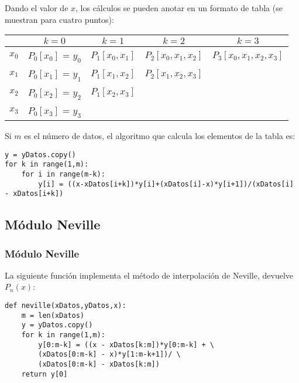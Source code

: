 \begin{frame}
Dando el valor de $x$, los cálculos se pueden anotar en un formato de tabla (se muestran para cuatro puntos):
\fontsize{12}{12}\selectfont
\begin{center}
	\begin{tabular}{| c | c | c | c | c |} \hline
		        & $k=0$ & $k=1$ & $k=2$ & $k=3$ \\ \hline
		$x_{0}$ & $P_{0}[x_{0}]$ = $y_{0}$ & $P_{1}[x_{0},x_{1}]$ & $P_{2}[x_{0},x_{1},x_{2}]$ & $P_{3}[x_{0},x_{1},x_{2},x_{3}]$ \\ \hline
		$x_{1}$ & $P_{0}[x_{1}]$ = $y_{1}$ & $P_{1}[x_{1},x_{2}]$ & $P_{2}[x_{1},x_{2},x_{3}]$ & \\ \hline
		$x_{2}$ & $P_{0}[x_{2}]$ = $y_{2}$ & $P_{1}[x_{2},x_{3}]$ &   & \\ \hline
		$x_{3}$ & $P_{0}[x_{3}]$ = $y_{3}$ &  &  & \\ \hline
	\end{tabular}
\end{center}
\end{frame}
\begin{frame}[fragile]
Si $m$ es el número de datos, el algoritmo que calcula los elementos de la tabla es:
\\
\medskip
\begin{lstlisting}
y = yDatos.copy()
for k in range(1,m):
    for i in range(m-k):
        y[i] = ((x-xDatos[i+k])*y[i]+(xDatos[i]-x)*y[i+1])/(xDatos[i] - xDatos[i+k])
\end{lstlisting}
\end{frame}
\subsection{Módulo Neville}
\begin{frame}[fragile]
\frametitle{Módulo Neville}
La siguiente función implementa el método de interpolación de Neville, devuelve $P_{n}(x)$:
\begin{lstlisting}
def neville(xDatos,yDatos,x):
    m = len(xDatos)
    y = yDatos.copy()
    for k in range(1,m):
        y[0:m-k] = ((x - xDatos[k:m])*y[0:m-k] + \
        (xDatos[0:m-k] - x)*y[1:m-k+1])/ \
        (xDatos[0:m-k] - xDatos[k:m])
    return y[0]
\end{lstlisting}
\end{frame}
